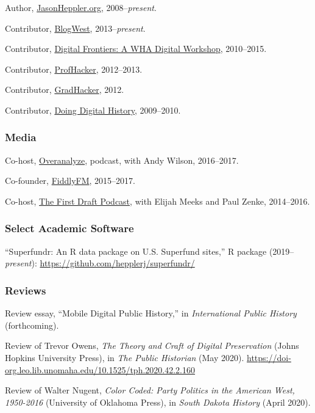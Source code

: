 Author, \href{http://jasonheppler.org}{JasonHeppler.org},
2008--\emph{present}.

Contributor, \href{http://blogwest.org/}{BlogWest},
2013--\emph{present}.

Contributor, \href{http://whadigitalfrontiers.com/}{Digital Frontiers: A
WHA Digital Workshop}, 2010--2015.

Contributor, \href{http://chronicle.com/blogs/profhacker/}{ProfHacker},
2012--2013.

Contributor,
\href{https://www.insidehighered.com/blogs/gradhacker}{GradHacker},
2012.

Contributor, \href{http://digitalhistory.unl.edu/}{Doing Digital
History}, 2009--2010.

\subsubsection{Media}\label{media}

Co-host, \href{http://overanalyze.fireside.fm}{Overanalyze}, podcast,
with Andy Wilson, 2016--2017.

Co-founder, \href{http://fiddly.fm}{FiddlyFM}, 2015--2017.

Co-host, \href{http://www.fiddly.fm/firstdraft/}{The First Draft
Podcast}, with Elijah Meeks and Paul Zenke, 2014--2016.

\subsubsection{Select Academic Software}\label{select-academic-software}

``Superfundr: An R data package on U.S. Superfund sites,'' R package
(2019--\emph{present}): \url{https://github.com/hepplerj/superfundr/}

\subsubsection{Reviews}\label{reviews}

Review essay, ``Mobile Digital Public History,'' in \emph{International
Public History} (forthcoming).

Review of Trevor Owens, \emph{The Theory and Craft of Digital
Preservation} (Johns Hopkins University Press), in \emph{The Public
Historian} (May 2020).
\url{https://doi-org.leo.lib.unomaha.edu/10.1525/tph.2020.42.2.160}

Review of Walter Nugent, \emph{Color Coded: Party Politics in the
American West, 1950-2016} (University of Oklahoma Press), in \emph{South
Dakota History} (April 2020).

